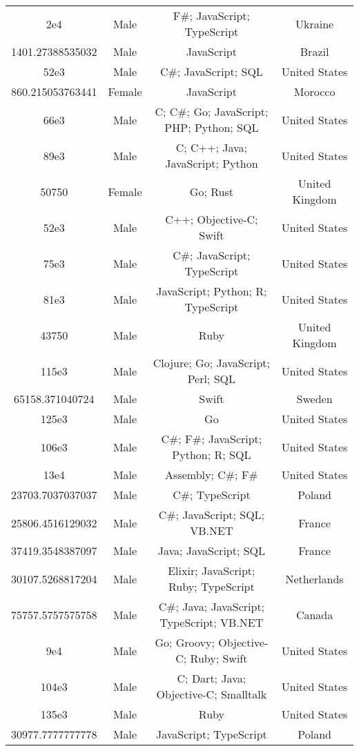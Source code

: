 \begin{center}
\begin{tabular}{ |c|c|c|c| }
2e4  &  Male  &  F\#; JavaScript; TypeScript  &  Ukraine  \\ 
1401.27388535032  &  Male  &  JavaScript  &  Brazil  \\ 
52e3  &  Male  &  C\#; JavaScript; SQL  &  United States  \\ 
860.215053763441  &  Female  &  JavaScript  &  Morocco  \\ 
66e3  &  Male  &  C; C\#; Go; JavaScript; PHP; Python; SQL  &  United States  \\ 
89e3  &  Male  &  C; C++; Java; JavaScript; Python  &  United States  \\ 
50750  &  Female  &  Go; Rust  &  United Kingdom  \\ 
52e3  &  Male  &  C++; Objective-C; Swift  &  United States  \\ 
75e3  &  Male  &  C\#; JavaScript; TypeScript  &  United States  \\ 
81e3  &  Male  &  JavaScript; Python; R; TypeScript  &  United States  \\ 
43750  &  Male  &  Ruby  &  United Kingdom  \\ 
115e3  &  Male  &  Clojure; Go; JavaScript; Perl; SQL  &  United States  \\ 
65158.371040724  &  Male  &  Swift  &  Sweden  \\ 
125e3  &  Male  &  Go  &  United States  \\ 
106e3  &  Male  &  C\#; F\#; JavaScript; Python; R; SQL  &  United States  \\ 
13e4  &  Male  &  Assembly; C\#; F\#  &  United States  \\ 
23703.7037037037  &  Male  &  C\#; TypeScript  &  Poland  \\ 
25806.4516129032  &  Male  &  C\#; JavaScript; SQL; VB.NET  &  France  \\ 
37419.3548387097  &  Male  &  Java; JavaScript; SQL  &  France  \\ 
30107.5268817204  &  Male  &  Elixir; JavaScript; Ruby; TypeScript  &  Netherlands  \\ 
75757.5757575758  &  Male  &  C\#; Java; JavaScript; TypeScript; VB.NET  &  Canada  \\ 
9e4  &  Male  &  Go; Groovy; Objective-C; Ruby; Swift  &  United States  \\ 
104e3  &  Male  &  C; Dart; Java; Objective-C; Smalltalk  &  United States  \\ 
135e3  &  Male  &  Ruby  &  United States  \\ 
30977.7777777778  &  Male  &  JavaScript; TypeScript  &  Poland  \\ 

\end{tabular}
\end{center}
